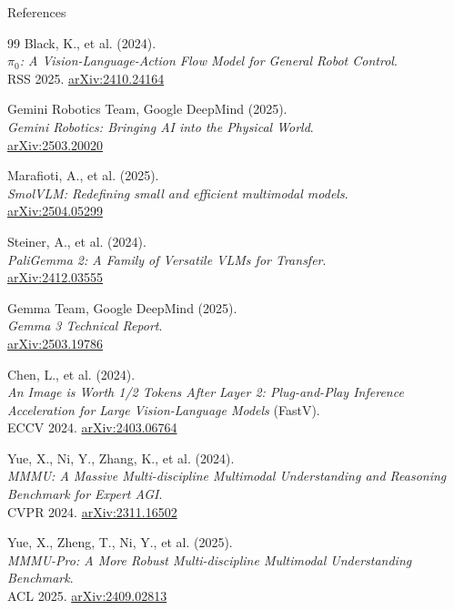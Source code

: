 \begin{frame}[allowframebreaks]{References}
\begin{thebibliography}{99}
      Black, K., et al. (2024). \\
      \emph{$\pi_0$: A Vision-Language-Action Flow Model for General Robot Control}.\\
      RSS 2025. \href{https://arxiv.org/abs/2410.24164}{arXiv:2410.24164}

      Gemini Robotics Team, Google DeepMind (2025). \\
      \emph{Gemini Robotics: Bringing AI into the Physical World}.\\
      \href{https://arxiv.org/abs/2503.20020}{arXiv:2503.20020}

      Marafioti, A., et al. (2025). \\
      \emph{SmolVLM: Redefining small and efficient multimodal models}.\\
      \href{https://arxiv.org/abs/2504.05299}{arXiv:2504.05299}

      Steiner, A., et al. (2024). \\
      \emph{PaliGemma 2: A Family of Versatile VLMs for Transfer}.\\
      \href{https://arxiv.org/abs/2412.03555}{arXiv:2412.03555}

      Gemma Team, Google DeepMind (2025). \\
      \emph{Gemma 3 Technical Report}.\\
      \href{https://arxiv.org/abs/2503.19786}{arXiv:2503.19786}

      Chen, L., et al. (2024). \\
      \emph{An Image is Worth 1/2 Tokens After Layer 2: Plug-and-Play Inference Acceleration for Large Vision-Language Models} (FastV).\\
      ECCV 2024. \href{https://arxiv.org/abs/2403.06764}{arXiv:2403.06764}

      Yue, X., Ni, Y., Zhang, K., et al. (2024). \\
      \emph{MMMU: A Massive Multi-discipline Multimodal Understanding and Reasoning Benchmark for Expert AGI}.\\
      CVPR 2024. \href{https://arxiv.org/abs/2311.16502}{arXiv:2311.16502}

      Yue, X., Zheng, T., Ni, Y., et al. (2025). \\
      \emph{MMMU-Pro: A More Robust Multi-discipline Multimodal Understanding Benchmark}.\\
      ACL 2025. \href{https://arxiv.org/abs/2409.02813}{arXiv:2409.02813}


\end{thebibliography}
\end{frame}
